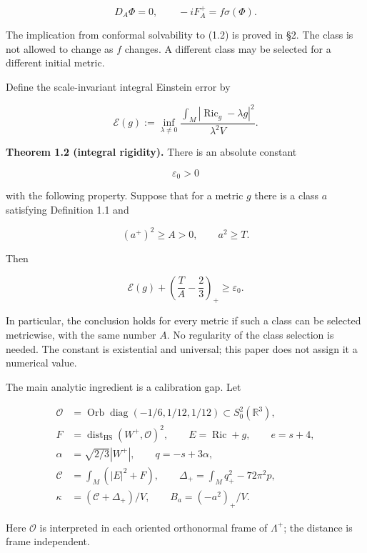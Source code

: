 \documentclass[
  10pt,
]{article}
\begin{document}
\[
 D_A\Phi=0,\qquad -iF_A^+=f\sigma(\Phi).                 \tag{1.2}
\]

The implication from conformal solvability to (1.2) is proved in §2. The
class is not allowed to change as \(f\) changes. A different class may
be selected for a different initial metric.

Define the scale-invariant integral Einstein error by

\[
 \mathcal E(g):=\inf_{\lambda\ne0}
  \frac{\int_M|\operatorname{Ric}_g-\lambda g|^2}
       {\lambda^2V}.                                      \tag{1.3}
\]

\textbf{Theorem 1.2 (integral rigidity).} There is an absolute constant

\[
                       \varepsilon_0>0                   \tag{1.4}
\]

with the following property. Suppose that for a metric \(g\) there is a
class \(a\) satisfying Definition 1.1 and

\[
                     (a^+)^2\ge A>0,\qquad a^2\ge T.
 \tag{1.5}
\]

Then

\[
 \boxed{\displaystyle
 \mathcal E(g)+\left(\frac TA-\frac23\right)_+
                         \ge\varepsilon_0.}              \tag{1.6}
\]

In particular, the conclusion holds for every metric if such a class can
be selected metricwise, with the same number \(A\). No regularity of the
class selection is needed. The constant is existential and universal;
this paper does not assign it a numerical value.

The main analytic ingredient is a calibration gap. Let

\[
 \begin{aligned}
 \mathcal O&=\operatorname{Orb}\operatorname{diag}
                    (-1/6,1/12,1/12)\subset S^2_0(\mathbb R^3),\\
 F&=\operatorname{dist}_{\mathrm{HS}}(W^+,\mathcal O)^2,\qquad
 E=\operatorname{Ric}+g,\qquad e=s+4,\\
 \alpha&=\sqrt{2/3}|W^+|,\qquad q=-s+3\alpha,\\
 \mathcal C&=\int_M(|E|^2+F),\qquad
 \Delta_+=\int_Mq_+^2-72\pi^2p,\\
 \kappa&=(\mathcal C+\Delta_+)/V,\qquad
 B_a=(-a^2)_+/V.
 \end{aligned}                                              \tag{1.7}
\]

Here \(\mathcal O\) is interpreted in each oriented orthonormal frame of
\(\Lambda^+\); the distance is frame independent.
\end{document}
